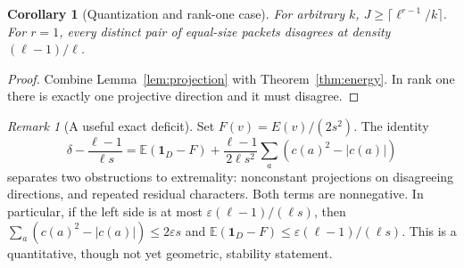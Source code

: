 \documentclass[11pt]{article}
\newtheorem{corollary}[theorem]{Corollary}
\theoremstyle{remark}\newtheorem{remark}[theorem]{Remark}
\newcommand{\E}{\mathbb E}
\newcommand{\1}{\mathbf 1}
\begin{document}
\begin{corollary}[Quantization and rank-one case]\label{cor:rounding}
For arbitrary $k$, $J\ge\lceil\ell^{r-1}/k\rceil$. For $r=1$, every distinct pair of equal-size packets disagrees at density $(\ell-1)/\ell$.
\end{corollary}
\begin{proof}
Combine Lemma~\ref{lem:projection} with Theorem~\ref{thm:energy}. In rank one there is exactly one projective direction and it must disagree.
\end{proof}
\begin{remark}[A useful exact deficit]
Set $F(v)=E(v)/(2s^2)$. The identity
\[
 \delta-\frac{\ell-1}{\ell s}
 =\E(\1_D-F)+\frac{\ell-1}{2\ell s^2}\sum_a (c(a)^2-|c(a)|)
\]
separates two obstructions to extremality: nonconstant projections on disagreeing directions, and repeated residual characters. Both terms are nonnegative. In particular, if the left side is at most $\varepsilon(\ell-1)/(\ell s)$, then $\sum_a(c(a)^2-|c(a)|)\le2\varepsilon s$ and $\E(\1_D-F)\le\varepsilon(\ell-1)/(\ell s)$. This is a quantitative, though not yet geometric, stability statement.
\end{remark}
\end{document}
